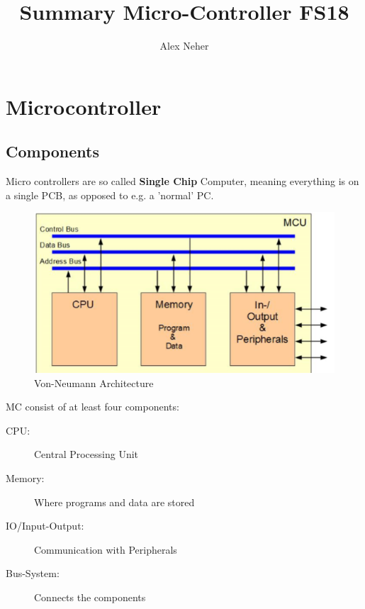 \documentclass[a4paper, 11pt, nofootinbib]{book}
\begin{document}
\title{Summary Micro-Controller FS18}
\author{Alex Neher}
\maketitle

\tableofcontents

\graphicspath{{./Pictures/}}

\mainmatter
\chapter{Microcontroller}
\section{Components}
Micro controllers are so called \textbf{Single Chip} Computer, meaning everything is on a single PCB, as opposed to e.g. a 'normal' PC.

\begin{figure}
	\centering
	\includegraphics[keepaspectratio=true,height=10\baselineskip]{architecture.PNG}
	\caption{Von-Neumann Architecture}
	\label{fig:arch}
\end{figure}

MC consist of at least four components:

\begin{description}
	\item[CPU: ] Central Processing Unit
	\item[Memory: ] Where programs and data are stored
	\item[IO/Input-Output: ] Communication with Peripherals
	\item[Bus-System: ] Connects the components
\end{description}

\vspace{10px}
\end{document}
